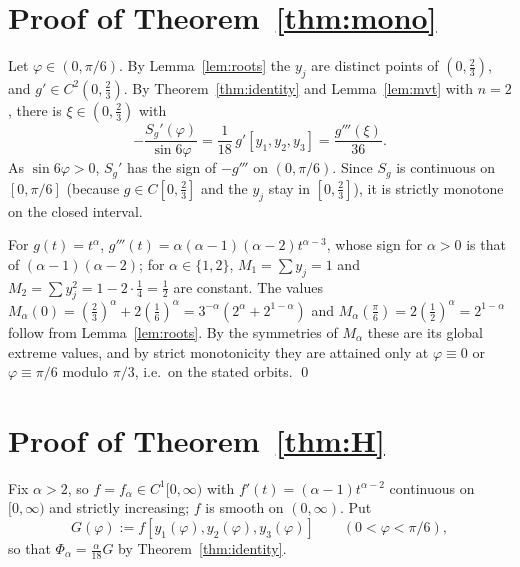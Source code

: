 \documentclass[11pt]{amsart}
\theoremstyle{remark}
\begin{document}
\section{\texorpdfstring{Proof of Theorem~\ref{thm:mono}}{Proof of Theorem}}

Let $\varphi\in(0,\pi/6)$. By Lemma~\ref{lem:roots} the $y_j$ are distinct points of
$(0,\frac23)$, and $g'\in C^2(0,\frac23)$. By Theorem~\ref{thm:identity} and
Lemma~\ref{lem:mvt} with $n=2$, there is $\xi\in(0,\frac23)$ with
\[
-\frac{S_g'(\varphi)}{\sin 6\varphi}=\frac1{18}\,g'[y_1,y_2,y_3]=\frac{g'''(\xi)}{36}.
\]
As $\sin6\varphi>0$, $S_g'$ has the sign of $-g'''$ on $(0,\pi/6)$. Since $S_g$ is
continuous on $[0,\pi/6]$ (because $g\in C[0,\frac23]$ and the $y_j$ stay in
$[0,\frac23]$), it is strictly monotone on the closed interval.

For $g(t)=t^\alpha$, $g'''(t)=\alpha(\alpha-1)(\alpha-2)t^{\alpha-3}$, whose sign for
$\alpha>0$ is that of $(\alpha-1)(\alpha-2)$; for $\alpha\in\{1,2\}$,
$M_1=\sum y_j=1$ and $M_2=\sum y_j^2=1-2\cdot\frac14=\frac12$ are constant. The values
$M_\alpha(0)=(\frac23)^\alpha+2(\frac16)^\alpha=3^{-\alpha}(2^\alpha+2^{1-\alpha})$ and
$M_\alpha(\frac\pi6)=2(\frac12)^\alpha=2^{1-\alpha}$ follow from Lemma~\ref{lem:roots}.
By the symmetries of $M_\alpha$ these are its global extreme values, and by strict
monotonicity they are attained only at $\varphi\equiv0$ or $\varphi\equiv\pi/6$
modulo $\pi/3$, i.e.\ on the stated orbits. \qed

\section{\texorpdfstring{Proof of Theorem~\ref{thm:H}}{Proof of Theorem}}

Fix $\alpha>2$, so $f=f_\alpha\in C^1[0,\infty)$ with $f'(t)=(\alpha-1)t^{\alpha-2}$
continuous on $[0,\infty)$ and strictly increasing; $f$ is smooth on $(0,\infty)$. Put
\[
G(\varphi):=f[y_1(\varphi),y_2(\varphi),y_3(\varphi)]\qquad(0<\varphi<\pi/6),
\]
so that $\Phi_\alpha=\frac{\alpha}{18}G$ by Theorem~\ref{thm:identity}.
\end{document}
